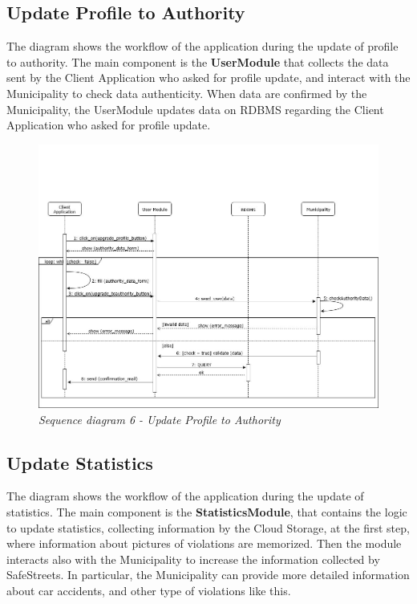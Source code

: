 \subsection{Update Profile to Authority}
The diagram shows the workflow of the application during the update of profile to authority. The main component is the \textbf{UserModule} 
that collects the data sent by the Client Application who asked for profile update, and interact with the Municipality to check data 
authenticity. When data are confirmed by the Municipality, the UserModule updates data on RDBMS regarding the Client Application who asked for 
profile update.

\begin{figure}[H]
  \centering
  \includegraphics[width=\textwidth]{DD_Images/RuntimeView/6.jpg}
  \caption{\textit{Sequence diagram 6 - Update Profile to Authority}}
\end{figure}

\subsection{Update Statistics}
The diagram shows the workflow of the application during the update of statistics. The main component is the \textbf{StatisticsModule}, that
contains the logic to update statistics, collecting information by the Cloud Storage, at the first step, where information about pictures of 
violations are memorized. Then the module interacts also with the Municipality to increase the information collected by SafeStreets. In particular, 
the Municipality can provide more detailed information about car accidents, and other type of violations like this.

